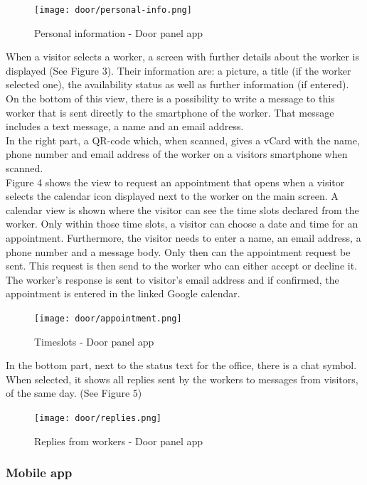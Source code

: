 \documentclass[article,colorback,accentcolor=tud4c, 11pt]{tudreport}
\begin{document}
	\begin{figure}
		\centering
		\texttt{[image: door/personal-info.png]}
		\caption{Personal information - Door panel app}
	\end{figure}	
	

When a visitor selects a worker, a screen with further details about the worker is displayed (See Figure 3). Their information are: a picture, a title (if the worker selected one), the availability status as well as further information (if  entered). On the bottom of this view, there is a possibility to write a message to this worker that is sent directly to the smartphone of the worker. That message includes a text message, a name and an email address.\\
In the right part, a QR-code which, when scanned, gives a vCard with the name, phone number and email address of the worker on a visitors smartphone when scanned.\\

Figure 4 shows the view to request an appointment that opens when a visitor selects the calendar icon displayed next to the worker on the main screen. A calendar view is shown where the visitor can see the time slots declared from the worker. Only within those time slots, a visitor can choose a date and time for an appointment. Furthermore, the visitor needs to enter a name, an email address, a phone number and a message body. Only then can the appointment request be sent.
This request is then send to the worker who can either accept or decline it. The worker's response is sent to visitor's email address and if confirmed, the appointment is entered in the linked Google calendar.\\

	\begin{figure}
		\centering
		\texttt{[image: door/appointment.png]}
		\caption{Timeslots - Door panel app}
	\end{figure}

In the bottom part, next to the status text for the office, there is a chat symbol. When selected, it shows all replies sent by the workers to messages from visitors, of the same day. (See Figure 5)

	\begin{figure}
		\centering
		\texttt{[image: door/replies.png]}
		\caption{Replies from workers - Door panel app}
	\end{figure}

\subsubsection{Mobile app}
\end{document}
